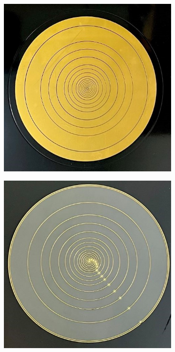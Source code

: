 \begin{figure}[]
\centering
\begin{subfigure}{.45\textwidth}
  \centering
  \includegraphics[width=\textwidth]{images/thick_board_example.jpg}
  \caption{}
\end{subfigure}%
\begin{subfigure}{.45\textwidth}
  \centering
  \includegraphics[width=\textwidth]{images/thin_trace_board_example.jpg}

\end{subfigure}
\end{figure}
